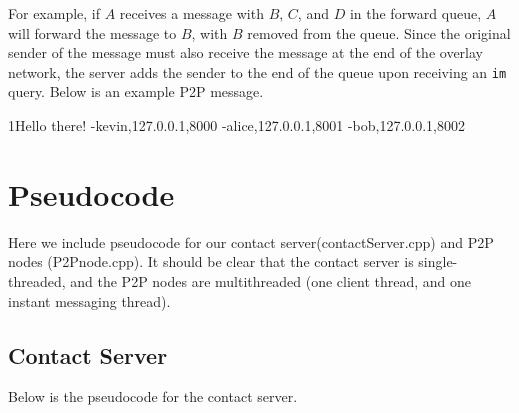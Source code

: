 \documentclass[letterpaper]{article}
\newenvironment{CVerbatim}
 {\singlespacing\center\BVerbatim}
 {\endBVerbatim\endcenter}
\begin{document}
For example, if $A$ receives a message with $B$, $C$, and $D$ in the forward queue, $A$ will
forward the message to $B$, with $B$ removed from the queue. Since the original sender of the message must also receive the message at the end of the overlay network, the server adds the sender to the end of the queue upon receiving an {\tt im} query. Below is an example P2P message.

\begin{CVerbatim}[fontsize=\small]
1Hello there!
-kevin,127.0.0.1,8000
-alice,127.0.0.1,8001
-bob,127.0.0.1,8002
\end{CVerbatim}

\section{Pseudocode}
Here we include pseudocode for our contact server(contactServer.cpp) and P2P nodes (P2Pnode.cpp). It should be clear that the contact server is single-threaded, and the P2P nodes are multithreaded (one client thread, and one instant messaging thread).

\subsection{Contact Server}
Below is the pseudocode for the contact server.

\begin{algorithmic}[1]
    \EndIf{}
    \EndCase{}
    \EndCase{}
    \EndCase{}
    \EndCase{}
    \EndCase{}
    \EndIf{}
    \EndCase{}
\EndSwitch{}
    \EndWhile{}
    \EndProcedure{}
\end{algorithmic}
\end{document}
